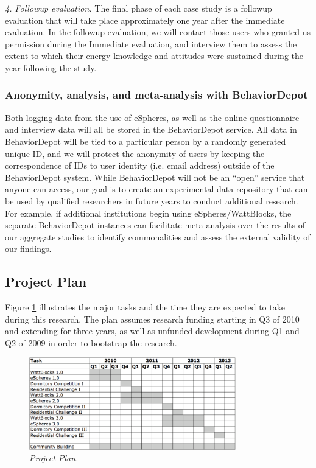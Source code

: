 {\em 4. Followup evaluation.}  The final phase of each case study
is a followup evaluation that will take place approximately one year after
the immediate evaluation.   In the followup evaluation, we will contact
those users who granted us permission during the Immediate evaluation, and
interview them to assess the extent to which their energy knowledge and
attitudes were sustained during the year following the study. 

\subsubsection{Anonymity, analysis,  and meta-analysis with BehaviorDepot}

Both logging data from the use of eSpheres, as well as the online
questionnaire and interview data will all be stored in the BehaviorDepot
service.  All data in BehaviorDepot will be tied to a particular person by
a randomly generated unique ID, and we will protect the anonymity of users
by keeping the correspondence of IDs to user identity (i.e. email address)
outside of the BehaviorDepot system.  While BehaviorDepot will not be an
``open'' service that anyone can access, our goal is to create an
experimental data repository that can be used by qualified researchers in
future years to conduct additional research.  For example, if additional
institutions begin using eSpheres/WattBlocks, the separate BehaviorDepot
instances can facilitate meta-analysis over the results of our aggregate
studies to identify commonalities and assess the external validity of our
findings.


\subsection{Project Plan}
\label{sec:plan}

Figure \ref{fig:plan} illustrates the major tasks and the time they are
expected to take during this research.  The plan assumes research funding
starting in Q3 of 2010 and extending for three years, as well as unfunded
development during Q1 and Q2 of 2009 in order to bootstrap the
research.

\begin{figure}[th]
  \center
  \includegraphics[width=0.8\textwidth]{gantt.eps}
  \caption{\em \small Project Plan.}
 \label{fig:plan}
\end{figure} 


